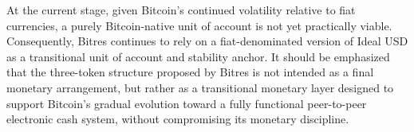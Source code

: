 \documentclass{article}
\begin{document}
At the current stage, given Bitcoin's continued volatility relative to fiat currencies, a purely Bitcoin-native unit of account is not yet practically viable. Consequently, Bitres continues to rely on a fiat-denominated version of Ideal USD as a transitional unit of account and stability anchor. It should be emphasized that the three-token structure proposed by Bitres is not intended as a final monetary arrangement, but rather as a transitional monetary layer designed to support Bitcoin's gradual evolution toward a fully functional peer-to-peer electronic cash system, without compromising its monetary discipline.



\end{document}
